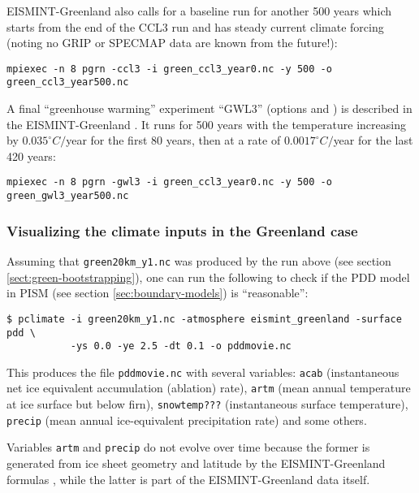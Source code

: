 EISMINT-Greenland also calls for a baseline run for another 500 years which starts from the end of the CCL3 run and has steady current climate forcing (noting no GRIP or SPECMAP data are known from the future!):

\begin{verbatim}
mpiexec -n 8 pgrn -ccl3 -i green_ccl3_year0.nc -y 500 -o green_ccl3_year500.nc
\end{verbatim}

A final ``greenhouse warming'' experiment ``GWL3'' (options  and ) is described in the EISMINT-Greenland \cite{RitzEISMINT}.  It runs for 500 years with the temperature increasing by $0.035^\circ C/$year for the first 80 years, then at a rate of $0.0017^\circ C/$year for the last 420 years:

\begin{verbatim}
mpiexec -n 8 pgrn -gwl3 -i green_ccl3_year0.nc -y 500 -o green_gwl3_year500.nc
\end{verbatim}

\subsubsection*{Visualizing the climate inputs in the Greenland case}
\label{sec:pdd-series-with-pclimate}

Assuming that \texttt{green20km_y1.nc} was produced by the run above (see section
\ref{sect:green-bootstrapping}), one can run the following to check if the PDD
model in PISM (see section \ref{sec:boundary-models}) is ``reasonable'':
\begin{verbatim}
$ pclimate -i green20km_y1.nc -atmosphere eismint_greenland -surface pdd \
           -ys 0.0 -ye 2.5 -dt 0.1 -o pddmovie.nc 
\end{verbatim}%
This produces the file \texttt{pddmovie.nc} with several variables: \texttt{acab}
(instantaneous net ice equivalent accumulation (ablation) rate), \texttt{artm}
(mean annual temperature at ice surface but below firn), \texttt{snowtemp???}
(instantaneous surface temperature), \texttt{precip} (mean annual
ice-equivalent precipitation rate) and some others.

Variables \texttt{artm} and \texttt{precip} do not evolve over time because the 
former is generated from ice sheet geometry and latitude by the EISMINT-Greenland
formulas \cite{RitzEISMINT}, while the latter is part of the EISMINT-Greenland data
itself.


